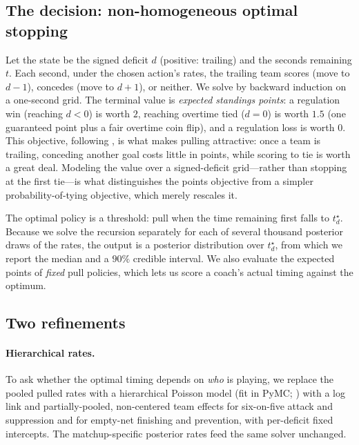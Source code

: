 \documentclass[11pt]{article}
\begin{document}
\subsection{The decision: non-homogeneous optimal stopping}

Let the state be the signed deficit $d$ (positive: trailing) and the seconds
remaining $t$. Each second, under the chosen action's rates, the trailing team
scores (move to $d-1$), concedes (move to $d+1$), or neither. We solve by backward
induction on a one-second grid. The terminal value is \emph{expected standings
points}: a regulation win (reaching $d<0$) is worth $2$, reaching overtime tied
($d=0$) is worth $1.5$ (one guaranteed point plus a fair overtime coin flip), and a
regulation loss is worth $0$. This objective, following \citet{brown2018pulling},
is what makes pulling attractive: once a team is trailing, conceding another goal
costs little in points, while scoring to tie is worth a great deal. Modeling the
value over a signed-deficit grid---rather than stopping at the first tie---is what
distinguishes the points objective from a simpler probability-of-tying objective,
which merely rescales it.

The optimal policy is a threshold: pull when the time remaining first falls to
$t^\star_d$. Because we solve the recursion separately for each of several thousand
posterior draws of the rates, the output is a posterior distribution over
$t^\star_d$, from which we report the median and a $90\%$ credible interval. We
also evaluate the expected points of \emph{fixed} pull policies, which lets us
score a coach's actual timing against the optimum.

\subsection{Two refinements}

\paragraph{Hierarchical rates.} To ask whether the optimal timing depends on
\emph{who} is playing, we replace the pooled pulled rates with a hierarchical
Poisson model (fit in PyMC; \citealp{abrilpla2023pymc,kumar2019arviz}) with a log
link and partially-pooled, non-centered team effects for six-on-five attack and
suppression and for empty-net finishing and prevention, with per-deficit fixed
intercepts. The matchup-specific posterior rates feed the same solver unchanged.
\end{document}
